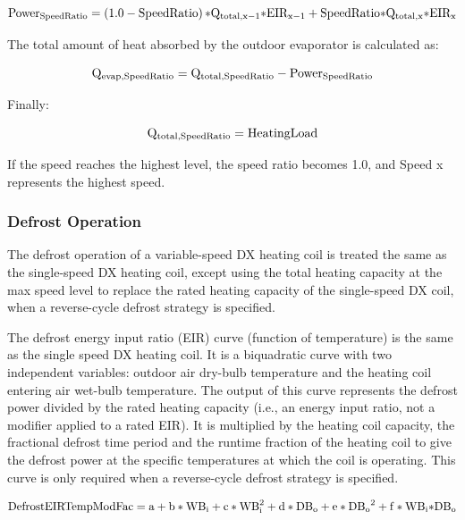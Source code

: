\begin{equation}
{\rm{Powe}}{{\rm{r}}_{{\rm{SpeedRatio}}}} = \left( {1.0 - {\rm{SpeedRatio}}} \right){\rm{*}}{{\rm{Q}}_{{\rm{total}},{\rm{x}} - 1}}{\rm{*EI}}{{\rm{R}}_{{\rm{x}} - 1}} + {\rm{SpeedRatio*}}{{\rm{Q}}_{{\rm{total}},{\rm{x}}}}{\rm{*EI}}{{\rm{R}}_{\rm{x}}}
\end{equation}

The total amount of heat absorbed by the outdoor evaporator is calculated as:

\begin{equation}
{{\rm{Q}}_{{\rm{evap}},{\rm{SpeedRatio}}}} = {{\rm{Q}}_{{\rm{total}},{\rm{SpeedRatio}}}} - {\rm{Powe}}{{\rm{r}}_{{\rm{SpeedRatio}}}}
\end{equation}

Finally:

\begin{equation}
{{\rm{Q}}_{{\rm{total}},{\rm{SpeedRatio}}}} = {\rm{HeatingLoad}}
\end{equation}

If the speed reaches the highest level, the speed ratio becomes 1.0, and Speed x represents the highest speed.

\subsubsection{Defrost Operation}\label{defrost-operation-1}

The defrost operation of a variable-speed DX heating coil is treated the same as the single-speed DX heating coil, except using the total heating capacity at the max speed level to replace the rated heating capacity of the single-speed DX coil, when a reverse-cycle defrost strategy is specified.

The defrost energy input ratio (EIR) curve (function of temperature) is the same as the single speed DX heating coil. It is a biquadratic curve with two independent variables: outdoor air dry-bulb temperature and the heating coil entering air wet-bulb temperature. The output of this curve represents the defrost power divided by the rated heating capacity (i.e., an energy input ratio, not a modifier applied to a rated EIR). It is multiplied by the heating coil capacity, the fractional defrost time period and the runtime fraction of the heating coil to give the defrost power at the specific temperatures at which the coil is operating. This curve is only required when a reverse-cycle defrost strategy is specified.

\begin{equation}
{\rm{DefrostEIRTempModFac}} = {\rm{a}} + {\rm{b*W}}{{\rm{B}}_{\rm{i}}} + {\rm{c*WB}}_{\rm{i}}^2 + {\rm{d*D}}{{\rm{B}}_{\rm{o}}} + {\rm{e*D}}{{\rm{B}}_{\rm{o}}}^2 + {\rm{f*W}}{{\rm{B}}_{\rm{i}}}{\rm{*D}}{{\rm{B}}_{\rm{o}}}
\end{equation}

